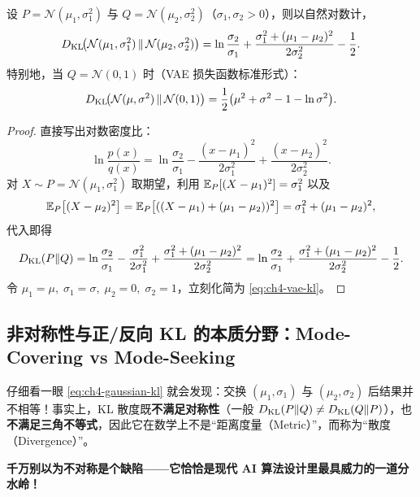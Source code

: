 \begin{proposition}
\label{prop:ch4-gaussian-kl}
设 $P = \mathcal{N}(\mu_1, \sigma_1^2)$ 与 $Q = \mathcal{N}(\mu_2, \sigma_2^2)$（$\sigma_1, \sigma_2 > 0$），则以自然对数计，
\begin{equation}
  D_{\mathrm{KL}}\!\bigl(\mathcal{N}(\mu_1, \sigma_1^2) \,\|\, \mathcal{N}(\mu_2, \sigma_2^2)\bigr)
  = \ln\frac{\sigma_2}{\sigma_1} + \frac{\sigma_1^2 + (\mu_1 - \mu_2)^2}{2\sigma_2^2} - \frac{1}{2}. \label{eq:ch4-gaussian-kl}
\end{equation}
特别地，当 $Q = \mathcal{N}(0, 1)$ 时（VAE 损失函数标准形式）：
\begin{equation}
  D_{\mathrm{KL}}\!\bigl(\mathcal{N}(\mu, \sigma^2) \,\|\, \mathcal{N}(0, 1)\bigr)
  = \frac{1}{2}\bigl(\mu^2 + \sigma^2 - 1 - \ln \sigma^2\bigr). \label{eq:ch4-vae-kl}
\end{equation}
\end{proposition}

\begin{proof}
直接写出对数密度比：
\[
  \ln\frac{p(x)}{q(x)}
  = \ln\frac{\sigma_2}{\sigma_1} - \frac{(x - \mu_1)^2}{2\sigma_1^2} + \frac{(x - \mu_2)^2}{2\sigma_2^2}.
\]
对 $X \sim P = \mathcal{N}(\mu_1, \sigma_1^2)$ 取期望，利用 $\mathbb{E}_P[(X - \mu_1)^2] = \sigma_1^2$ 以及
\[
  \mathbb{E}_P\bigl[(X - \mu_2)^2\bigr]
  = \mathbb{E}_P\bigl[((X - \mu_1) + (\mu_1 - \mu_2))^2\bigr]
  = \sigma_1^2 + (\mu_1 - \mu_2)^2,
\]
代入即得
\[
  D_{\mathrm{KL}}(P \| Q)
  = \ln\frac{\sigma_2}{\sigma_1} - \frac{\sigma_1^2}{2\sigma_1^2} + \frac{\sigma_1^2 + (\mu_1 - \mu_2)^2}{2\sigma_2^2}
  = \ln\frac{\sigma_2}{\sigma_1} + \frac{\sigma_1^2 + (\mu_1 - \mu_2)^2}{2\sigma_2^2} - \frac{1}{2}.
\]
令 $\mu_1 = \mu,\; \sigma_1 = \sigma,\; \mu_2 = 0,\; \sigma_2 = 1$，立刻化简为 \eqref{eq:ch4-vae-kl}。
\end{proof}

\subsection{非对称性与正/反向 KL 的本质分野：Mode-Covering vs Mode-Seeking}

仔细看一眼 \eqref{eq:ch4-gaussian-kl} 就会发现：交换 $(\mu_1,\sigma_1)$ 与 $(\mu_2,\sigma_2)$ 后结果并不相等！事实上，KL 散度既\textbf{不满足对称性}（一般 $D_{\mathrm{KL}}(P\|Q) \neq D_{\mathrm{KL}}(Q\|P)$），也\textbf{不满足三角不等式}，因此它在数学上不是“距离度量（Metric）”，而称为“散度（Divergence）”。

\textbf{千万别以为不对称是个缺陷——它恰恰是现代 AI 算法设计里最具威力的一道分水岭！}

